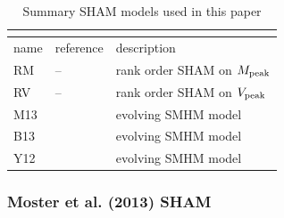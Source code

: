 \documentclass[a4paper,fleqn,usenatbib]{mnras}
\begin{document}
\begin{table}
\label{table:models}
\caption{Summary SHAM models used in this paper}
\begin{tabular}{ |p{0.55cm}|p{3cm}|p{3.65cm}}
\multicolumn{3}{|c|}{} \\
\hline
name & reference & description  \\
\hline
\hline
RM &  -- & rank order SHAM on $M_{\rm peak}$ \\
RV & -- & rank order SHAM on $V_{\rm peak}$ \\
M13 & \citet{Moster:2013ab} & evolving SMHM model \\
B13 & \citet{Behroozi:2013fg} & evolving SMHM model \\
Y12 & \citet{Yang:2012ew} & evolving SMHM model \\
\hline
\end{tabular}
\end{table}

\subsubsection{Moster et al. (2013) SHAM}
\label{sec:m13}
\end{document}
